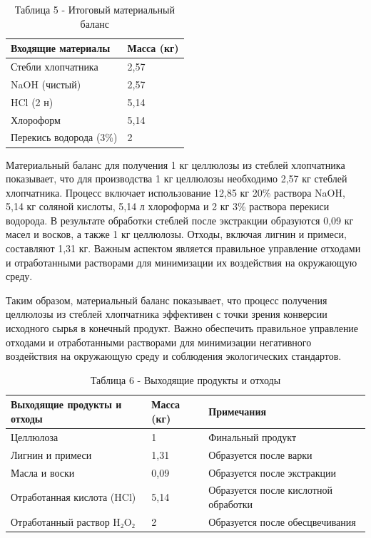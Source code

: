 \begin{table}[H]
\caption*{Таблица 5 - Итоговый материальный баланс}
\centering
\begin{tabular}{|l|l|}
\hline
Входящие материалы      & Масса (кг) \\ \hline
Стебли хлопчатника      & 2,57       \\ \hline
NaOH (чистый)           & 2,57       \\ \hline
HCl (2 н)               & 5,14       \\ \hline
Хлороформ               & 5,14       \\ \hline
Перекись водорода (3\%) & 2          \\ \hline
\end{tabular}
\end{table}

\begin{multicols}{2}
Материальный баланс для получения 1 кг целлюлозы из стеблей хлопчатника
показывает, что для производства 1 кг целлюлозы необходимо 2,57 кг
стеблей хлопчатника. Процесс включает использование 12,85 кг 20\%
раствора NaOH, 5,14 кг соляной кислоты, 5,14 л хлороформа и 2 кг 3\%
раствора перекиси водорода. В результате обработки стеблей после
экстракции образуются 0,09 кг масел и восков, а также 1 кг целлюлозы.
Отходы, включая лигнин и примеси, составляют 1,31 кг. Важным аспектом
является правильное управление отходами и отработанными растворами для
минимизации их воздействия на окружающую среду.

Таким образом, материальный баланс показывает, что процесс получения
целлюлозы из стеблей хлопчатника эффективен с точки зрения конверсии
исходного сырья в конечный продукт. Важно обеспечить правильное
управление отходами и отработанными растворами для минимизации
негативного воздействия на окружающую среду и соблюдения экологических
стандартов.
\end{multicols}

\begin{table}[H]
\caption*{Таблица 6 - Выходящие продукты и отходы}
\centering
\begin{tabular}{|l|l|l|}
\hline
Выходящие продукты и отходы & Масса (кг) & Примечания                           \\ \hline
Целлюлоза                   & 1          & Финальный продукт                    \\ \hline
Лигнин и примеси            & 1,31       & Образуется после варки               \\ \hline
Масла и воски               & 0,09       & Образуется после экстракции          \\ \hline
Отработанная кислота (HCl)  & 5,14       & Образуется после кислотной обработки \\ \hline
Отработанный раствор H₂O₂   & 2          & Образуется после обесцвечивания      \\ \hline
\end{tabular}
\end{table}

